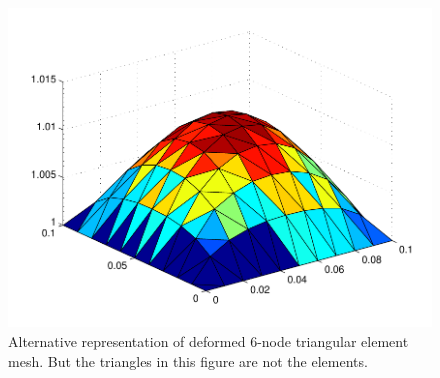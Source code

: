 \documentclass[../main.tex]{subfiles}
\begin{document}
\begin{figure}[h]
  \centering
  \includegraphics[scale=0.5]{./img/deformedMeshRefined.pdf}
  \caption{Alternative representation of deformed 6-node triangular
    element mesh. But the triangles in this figure are not the
    elements.}
  \label{fig:deformedMeshRefined}
\end{figure}
\end{document}
